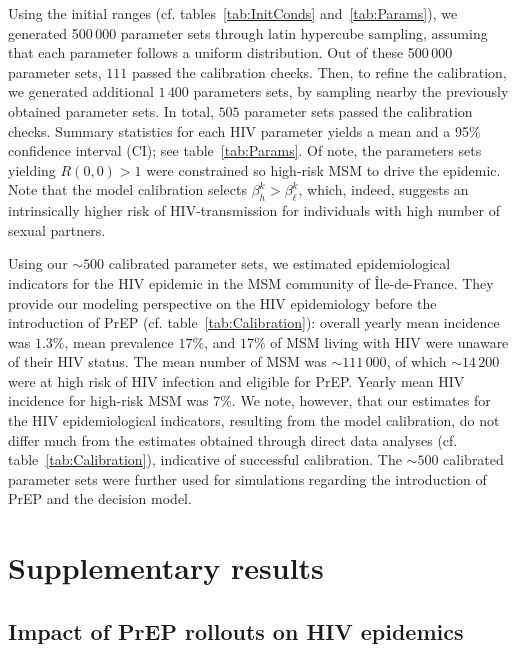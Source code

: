 \documentclass[12pt]{article}
\begin{document}
Using the initial ranges (cf. tables~\ref{tab:InitConds} and~\ref{tab:Params}), we generated 500\,000 parameter sets through latin hypercube sampling, assuming that each parameter follows a uniform distribution. Out of these 500\,000 parameter sets, $111$ passed the calibration checks. Then, to refine the calibration, we generated additional $1\,400$ parameters sets, by sampling nearby the previously obtained parameter sets. In total, $505$ parameter sets passed the calibration checks. Summary statistics for each HIV parameter yields a mean and a 95\% confidence interval (CI); see table~\ref{tab:Params}.  Of note, {the parameters sets yielding $R(0,0)>1$ were constrained so high-risk MSM to drive the epidemic. Note that the model calibration selects} $\beta^k_h>\beta^k_\ell$, which, indeed, suggests an {intrinsically higher risk of HIV-transmission for individuals with high number of sexual partners}. 

Using our $\sim500$ calibrated parameter sets, we estimated epidemiological indicators for the HIV epidemic in the MSM community of \^Ile-de-France.  They provide our modeling perspective on the HIV epidemiology before the introduction of PrEP (cf. table~\ref{tab:Calibration}): overall yearly mean incidence was $1.3\%$, mean prevalence $17\%$, and $17\%$ of MSM living with HIV were unaware of their HIV status. The mean number of MSM was $\sim111\,000$, of which $\sim14\,200$ were at high risk of HIV infection and eligible for PrEP. Yearly mean HIV incidence for high-risk MSM was $7\%$. We note, however, that our estimates for the HIV epidemiological indicators, resulting from the model calibration, do not differ much from the estimates obtained through direct data analyses (cf. table~\ref{tab:Calibration}), indicative of successful calibration. The $\sim500$ calibrated parameter sets were further used for simulations regarding the introduction of PrEP and the decision model.

\section{Supplementary results}

\subsection{Impact of PrEP rollouts on HIV epidemics}
\end{document}
